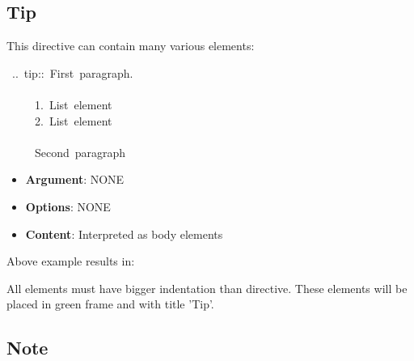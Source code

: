 \documentclass[12pt]{article}
\begin{document}
\hypertarget{ltip}{}
\subsection{Tip}

This directive can contain many various elements:

\begin{ttfamily}\begin{flushleft}
\mbox{~..~tip::~First~paragraph.}\\
\mbox{}\\
\mbox{~~~~~1.~List~element}\\
\mbox{~~~~~2.~List~element}\\
\mbox{}\\
\mbox{~~~~~Second~paragraph}\\
\end{flushleft}\end{ttfamily}

\begin{itemize}
\item
\textbf{Argument}: NONE

\item
\textbf{Options}: NONE

\item
\textbf{Content}: Interpreted as body elements
\end{itemize}

Above example results in:

\begin{center}
\end{center}

All elements must have bigger indentation than directive. These
elements will be placed in green frame and with title 'Tip'.

\hypertarget{lnote}{}
\subsection{Note}
\end{document}
